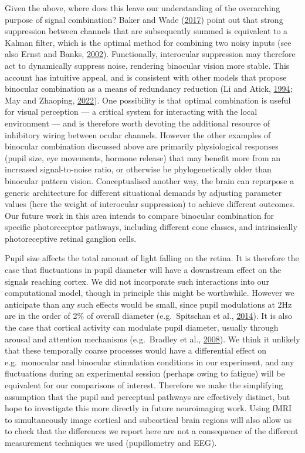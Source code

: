 \documentclass[
]{article}
\begin{document}
Given the above, where does this leave our understanding of the overarching purpose of signal combination? Baker and Wade (\protect\hyperlink{ref-Baker2017}{2017}) point out that strong suppression between channels that are subsequently summed is equivalent to a Kalman filter, which is the optimal method for combining two noisy inputs (see also Ernst and Banks, \protect\hyperlink{ref-Ernst2002}{2002}). Functionally, interocular suppression may therefore act to dynamically suppress noise, rendering binocular vision more stable. This account has intuitive appeal, and is consistent with other models that propose binocular combination as a means of redundancy reduction (Li and Atick, \protect\hyperlink{ref-Li1994}{1994}; May and Zhaoping, \protect\hyperlink{ref-May2022}{2022}). One possibility is that optimal combination is useful for visual perception --- a critical system for interacting with the local environment --- and is therefore worth devoting the additional resource of inhibitory wiring between ocular channels. However the other examples of binocular combination discussed above are primarily physiological responses (pupil size, eye movements, hormone release) that may benefit more from an increased signal-to-noise ratio, or otherwise be phylogenetically older than binocular pattern vision. Conceptualised another way, the brain can repurpose a generic architecture for different situational demands by adjusting parameter values (here the weight of interocular suppression) to achieve different outcomes. Our future work in this area intends to compare binocular combination for specific photoreceptor pathways, including different cone classes, and intrinsically photoreceptive retinal ganglion cells.

Pupil size affects the total amount of light falling on the retina. It is therefore the case that fluctuations in pupil diameter will have a downstream effect on the signals reaching cortex. We did not incorporate such interactions into our computational model, though in principle this might be worthwhile. However we anticipate than any such effects would be small, since pupil modulations at 2Hz are in the order of 2\% of overall diameter (e.g.~Spitschan et al., \protect\hyperlink{ref-Spitschan2014}{2014}). It is also the case that cortical activity can modulate pupil diameter, usually through arousal and attention mechanisms (e.g.~Bradley et al., \protect\hyperlink{ref-Bradley2008}{2008}). We think it unlikely that these temporally coarse processes would have a differential effect on e.g.~monocular and binocular stimulation conditions in our experiment, and any fluctuations during an experimental session (perhaps owing to fatigue) will be equivalent for our comparisons of interest. Therefore we make the simplifying assumption that the pupil and perceptual pathways are effectively distinct, but hope to investigate this more directly in future neuroimaging work. Using fMRI to simultaneously image cortical and subcortical brain regions will also allow us to check that the differences we report here are not a consequence of the different measurement techniques we used (pupillometry and EEG).
\end{document}

